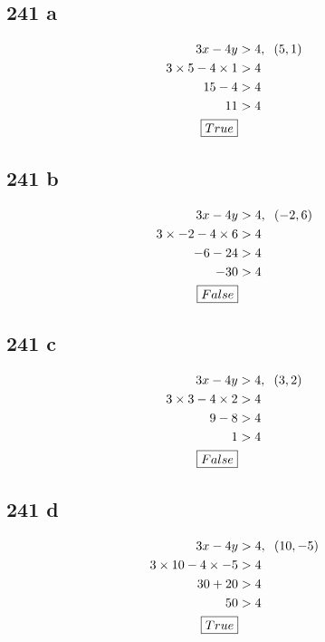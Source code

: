 \documentclass{article}
\begin{document}
    \subsection*{241 a}
    \begin{align*}
        3x - 4y &> 4, \hspace{.2cm}(5, 1)\\
        3 \times 5 - 4 \times 1 &> 4\\
        15 - 4 &> 4 \\
        11 &> 4\\
        \boxed{True}
    \end{align*}

    \subsection*{241 b}
    \begin{align*}
        3x - 4y &> 4, \hspace{.2cm}(-2, 6)\\
        3 \times -2 - 4 \times 6 &> 4\\
        -6 - 24 &> 4 \\
        -30 &> 4\\
        \boxed{False}
    \end{align*}

    \subsection*{241 c}
    \begin{align*}
        3x - 4y &> 4, \hspace{.2cm}(3, 2)\\
        3 \times 3 - 4 \times 2 &> 4\\
        9 - 8 &> 4 \\
        1 &> 4\\
        \boxed{False}
    \end{align*}

    \subsection*{241 d}
    \begin{align*}
        3x - 4y &> 4, \hspace{.2cm}(10, -5)\\
        3 \times 10 - 4 \times -5 &> 4\\
        30 + 20 &> 4 \\
        50 &> 4\\
        \boxed{True}
    \end{align*}
\end{document}
